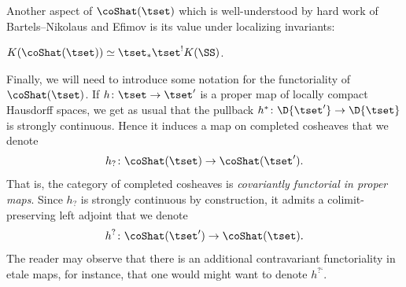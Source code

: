 Another aspect of $\coShat (\tset )$ which is well-understood by hard work of Bartels--Nikolaus and Efimov is its value under localizing invariants:
\begin{thm}\label{thm: K theory of completed cosheaves}
  $K(\coShat (\tset ))\simeq \tset_*\tset^!K (\SS )$.
\end{thm}
Finally, we will need to introduce some notation for the functoriality of $\coShat (\tset )$. If $h\colon\tset\to\tset '$ is a proper map of locally compact Hausdorff spaces, we get as usual that the pullback $h^*\colon\D{\tset '}\to \D{\tset}$ is strongly continuous. Hence it induces a map on completed cosheaves that we denote
\[
h_?\colon \coShat (\tset )\to \coShat (\tset ').
\]
That is, the category of completed cosheaves is {\em covariantly functorial in proper maps}. Since $h_?$ is strongly continuous by construction, it admits a colimit-preserving left adjoint that we denote
\[
h^?\colon \coShat (\tset ')\to \coShat (\tset ).
\]
The reader may observe that there is an additional contravariant functoriality in etale maps, for instance, that one would might want to denote $h^{\text{?`}}$.


\medskip

